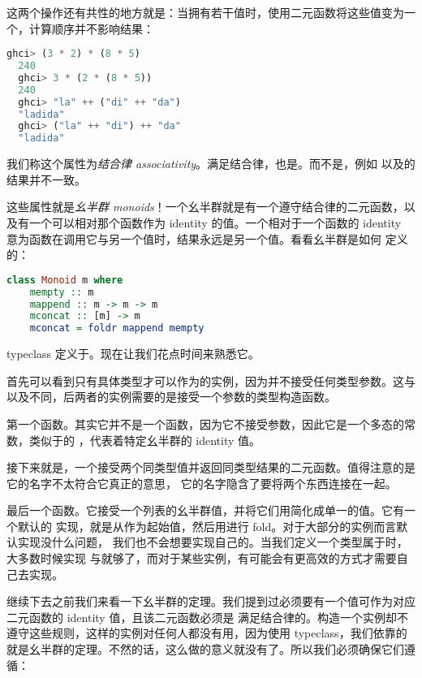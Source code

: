 \documentclass[./main.tex]{subfiles}
\begin{document}
这两个操作还有共性的地方就是：当拥有若干值时，使用二元函数将这些值变为一个，计算顺序并不影响结果：

\begin{lstlisting}[language=Haskell]
  ghci> (3 * 2) * (8 * 5)
  240
  ghci> 3 * (2 * (8 * 5))
  240
  ghci> "la" ++ ("di" ++ "da")
  "ladida"
  ghci> ("la" ++ "di") ++ "da"
  "ladida"
\end{lstlisting}

我们称这个属性为\textit{结合律 associativity}。\acode{*}满足结合律，\acode{++}也是。而\acode{-}不是，例如
以及的结果并不一致。

这些属性就是\textit{幺半群 monoids}！一个幺半群就是有一个遵守结合律的二元函数，以及有一个可以相对那个函数作为
identity 的值。一个相对于一个函数的 identity 意为函数在调用它与另一个值时，结果永远是另一个值。看看幺半群是如何
定义的：

\begin{lstlisting}[language=Haskell]
  class Monoid m where
    mempty :: m
    mappend :: m -> m -> m
    mconcat :: [m] -> m
    mconcat = foldr mappend mempty
\end{lstlisting}

 typeclass 定义于。现在让我们花点时间来熟悉它。

首先可以看到只有具体类型才可以作为的实例，因为并不接受任何类型参数。这与
以及不同，后两者的实例需要的是接受一个参数的类型构造函数。

第一个函数。其实它并不是一个函数，因为它不接受参数，因此它是一个多态的常数，类似于的
，代表着特定幺半群的 identity 值。

接下来就是，一个接受两个同类型值并返回同类型结果的二元函数。值得注意的是它的名字不太符合它真正的意思，
它的名字隐含了要将两个东西连接在一起。

最后一个函数。它接受一个列表的幺半群值，并将它们用简化成单一的值。它有一个默认的
实现，就是从作为起始值，然后用进行 fold。对于大部分的实例而言默认实现没什么问题，
我们也不会想要实现自己的。当我们定义一个类型属于时，大多数时候实现
与就够了，而对于某些实例，有可能会有更高效的方式才需要自己去实现。

继续下去之前我们来看一下幺半群的定理。我们提到过必须要有一个值可作为对应二元函数的 identity 值，且该二元函数必须是
满足结合律的。构造一个实例却不遵守这些规则，这样的实例对任何人都没有用，因为使用
typeclass，我们依靠的就是幺半群的定理。不然的话，这么做的意义就没有了。所以我们必须确保它们遵循：
\end{document}
